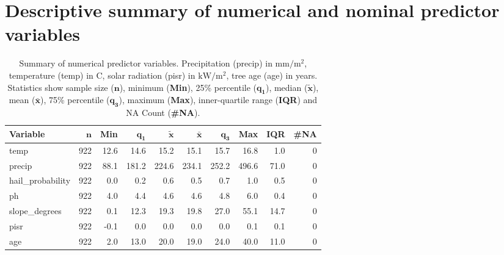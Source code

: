 \documentclass[review]{elsarticle}
\begin{document}
\appendix
\gdef\thesection{\Alph{section}} %
\makeatletter
\renewcommand\@seccntformat[1]{Appendix \csname the#1\endcsname.\hspace{0.5em}}
\makeatother

\section{Descriptive summary of numerical and nominal predictor variables}

\begin{table}[H]
	\centering
	\begingroup\footnotesize
	\begin{tabular}{lrrrrrrrrr}
	 \textbf{Variable} & $\mathbf{n}$ & \textbf{Min} & $\mathbf{q_1}$ & $\mathbf{\widetilde{x}}$ & $\mathbf{\bar{x}}$ & $\mathbf{q_3}$ & \textbf{Max} & \textbf{IQR} & \textbf{\#NA} \\
		\hline
	temp & 922 & 12.6 &  14.6 &  15.2 &  15.1 &  15.7 &  16.8 &  1.0 & 0 \\
		precip & 922 & 88.1 & 181.2 & 224.6 & 234.1 & 252.2 & 496.6 & 71.0 & 0 \\
		hail\_probability & 922 &  0.0 &   0.2 &   0.6 &   0.5 &   0.7 &   1.0 &  0.5 & 0 \\
		ph & 922 &  4.0 &   4.4 &   4.6 &   4.6 &   4.8 &   6.0 &  0.4 & 0 \\
		slope\_degrees & 922 &  0.1 &  12.3 &  19.3 &  19.8 &  27.0 &  55.1 & 14.7 & 0 \\
		pisr & 922 & -0.1 &   0.0 &   0.0 &   0.0 &   0.0 &   0.1 &  0.1 & 0 \\
		age & 922 &  2.0 &  13.0 &  20.0 &  19.0 &  24.0 &  40.0 & 11.0 & 0 \\
		\end{tabular}
	\endgroup
	\caption{Summary of numerical predictor variables. Precipitation (precip) in $\mathrm{mm/m^{2}}$, temperature (temp) in \degree C, solar radiation (pisr) in $\mathrm{kW/m^{2}}$, tree age (age) in years. Statistics show sample size ($\mathbf{n}$), minimum (\textbf{Min}), 25\% percentile ($\mathbf{q_1}$), median ($\mathbf{\widetilde{x}}$), mean ($\mathbf{\bar{x}}$), 75\% percentile ($\mathbf{q_3}$), maximum (\textbf{Max}), inner-quartile range (\textbf{IQR}) and NA Count (\textbf{\#NA}).}
	\label{}
	\end{table}
\end{document}
